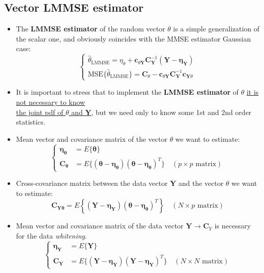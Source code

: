 \subsection{Vector LMMSE estimator}
\begin{itemize}
\item The \textbf{LMMSE estimator} of the random vector \(\theta\) is a simple generalization of the scalar one, and obviously coincides with the MMSE estimator Gaussian case:
\[
\begin{cases}
\hat{\theta}_{\text{LMMSE}} = \eta_{\theta} + \mathbf{c}_{\theta\mathbf{Y}}\mathbf{C}_{\mathbf{Y}}^{-1}(\mathbf{Y} - \boldsymbol{\eta}_{\mathbf{Y}}) \\[8pt]
\text{MSE}\{\hat{\theta}_{\text{LMMSE}}\} = \mathbf{C}_{\theta} - \mathbf{c}_{\theta\mathbf{Y}}\mathbf{C}_{\mathbf{Y}}^{-1}\mathbf{c}_{\mathbf{Y}\theta}
\end{cases}
\]
\item It is important to stress that to implement the \textbf{LMMSE estimator} of \(\theta\) \underline{it is not necessary to know}\\ \noindent \underline{the joint pdf of \(\theta\) and \textbf{Y}}, but we need only to know some 1st and 2nd order statistics.
\item Mean vector and covariance matrix of the vector \(\theta\) we want to estimate:
\[
\begin{cases}
\boldsymbol{\eta}_{\boldsymbol{\theta}} &= E\{\boldsymbol{\theta}\} \\[8pt]
\mathbf{C}_{\boldsymbol{\theta}} &= E\{(\boldsymbol{\theta} - \boldsymbol{\eta}_{\boldsymbol{\theta}})(\boldsymbol{\theta} - \boldsymbol{\eta}_{\boldsymbol{\theta}})^{T}\} \quad (p \times p \text{ matrix})
\end{cases}
\]
\item Cross-covariance matrix between the data vector \textbf{Y} and the vector \(\theta\) we want to estimate:
$$
\mathbf{C}_{\mathbf{Y}\boldsymbol{\theta}} = E\left\{(\mathbf{Y} - \boldsymbol{\eta}_{\mathbf{Y}})(\boldsymbol{\theta} - \boldsymbol{\eta}_{\boldsymbol{\theta}})^{T}\right\}
\quad (N \times p \text{ matrix})
$$

\item Mean vector and covariance matrix of the data vector \(\textbf{Y}\rightarrow\mathbf{C}_Y\) is necessary for the data \textit{whitening}.
\[
\begin{cases}
\boldsymbol{\eta}_{\mathbf{Y}} &= E\{\mathbf{Y}\} \\[8pt]
\mathbf{C}_{\mathbf{Y}} &= E\{(\mathbf{Y} - \boldsymbol{\eta}_{\mathbf{Y}})(\mathbf{Y} - \boldsymbol{\eta}_{\mathbf{Y}})^{T}\} \quad (N \times N \text{ matrix})
\end{cases}
\]
\end{itemize}
